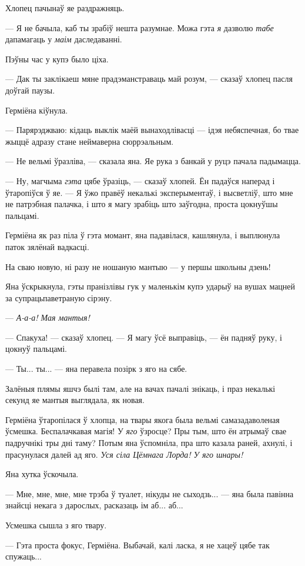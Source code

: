 Хлопец пачынаў яе раздражняць.

--- Я не бачыла, каб ты зрабіў нешта разумнае. Можа гэта \emph{я} дазволю
\emph{табе} дапамагаць у \emph{маім} даследаванні. 

Пэўны час у купэ было ціха.

--- Дак ты заклікаеш мяне прадэманстраваць май розум, --- сказаў хлопец пасля доўгай паузы.

Герміёна кіўнула.

--- Парярэджваю: кідаць выклік маёй вынаходлівасці --- ідэя небяспечная,
бо твае жыццё адразу стане неймаверна сюррэальным.

--- Не вельмі ўразліва, --- сказала яна. Яе рука з банкай у руцэ пачала 
падымацца.

--- Ну, магчыма \emph{гэта} цябе ўразіць, --- сказаў хлопей. Ён падаўся наперад і 
ўтаропіўся ў яе. --- Я ўжо правёў некалькі эксперыментаў, і высветліў, што 
мне не патрэбная палачка, і што я магу зрабіць што заўгодна, проста цокнуўшы пальцамі.

Герміёна як раз піла ў гэта момант, яна падавілася, кашлянула, і выплюнула 
паток зялёнай вадкасці.

На сваю новую, ні разу не ношаную мантыю --- у першы школьны дзень! 

Яна ўскрыкнула, гэты пранізлівы гук у маленькім купэ ударыў на вушах мацней 
за супрацьпаветраную сірэну.

--- \emph{А-а-а! Мая мантыя!}

--- Спакуха! --- сказаў хлопец. --- Я магу ўсё выправіць, --- ён падняў руку, і 
цокнуў пальцамі.

--- Ты... ты... --- яна перавела позірк з яго на сябе.

Залёныя плямы яшчэ былі там, але на вачах пачалі знікаць, і праз некалькі секунд 
яе мантыя выглядала, як новая.

Герміёна ўтаропілася ў хлопца, на твары якога была вельмі самазадаволеная ўсмешка. 
Беспалачкавая магія! У  \emph{яго} ўзросце? Пры тым, што ён атрымаў свае падручнікі
тры дні таму? Потым яна ўспомніла, пра што казала раней, ахнулі, і прасунулася далей ад яго.
\emph{Уся сіла Цёмнага Лорда! У яго шнары!}

Яна хутка ўскочыла. 

--- Мне, мне, мне, мне трэба ў туалет, нікуды не сыходзь... --- яна была павінна 
знайсці некага з дарослых, расказаць ім аб... аб...

Усмешка  сышла з яго твару.

--- Гэта проста фокус, Герміёна. Выбачай, калі ласка, я не хацеў цябе так спужаць...

